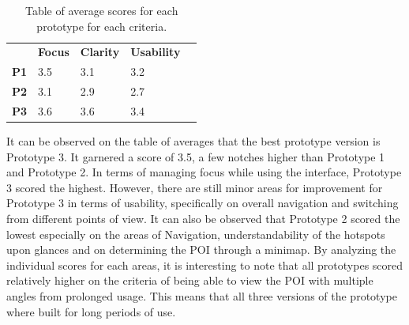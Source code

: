 \documentclass{sigchi}
\begin{document}
\begin{table}[h]
\centering
\caption{Table of average scores for each prototype for each criteria.}
\begin{tabular}{|l|l|l|l|l}
\cline{1-4}
            & \textbf{Focus} & \textbf{Clarity} & \textbf{Usability}   \\ \cline{1-4}
\textbf{P1} & 3.5            & 3.1              & 3.2                  \\ \cline{1-4}
\textbf{P2} & 3.1           & 2.9              & 2.7                 \\ \cline{1-4}
\textbf{P3} & 3.6           & 3.6              & 3.4                  \\ \cline{1-4}
\end{tabular}
\end{table}
It can be observed on the table of averages that the best prototype version is Prototype 3. It garnered a score of 3.5, a few notches higher than Prototype 1 and Prototype 2. In terms of managing focus while using the interface, Prototype 3 scored the highest. However, there are still minor areas for improvement for Prototype 3 in terms of usability, specifically on overall navigation and switching from different points of view. It can also be observed that Prototype 2 scored the lowest especially on the areas of Navigation, understandability of the hotspots upon glances and on determining the POI through a minimap. By analyzing the individual scores for each areas, it is interesting to note that all prototypes scored relatively higher on the criteria of being able to view the POI with multiple angles from prolonged usage. This means that all three versions of the prototype where built for long periods of use. 
\end{document}
